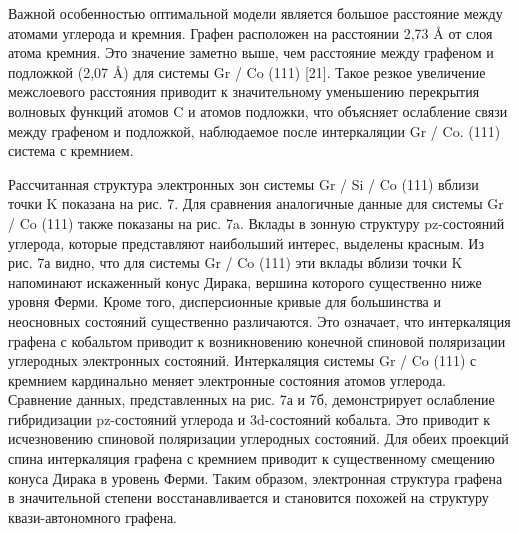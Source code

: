 Важной особенностью оптимальной модели является большое расстояние между атомами углерода и кремния. Графен расположен на расстоянии 2,73 Å от слоя атома кремния. Это значение заметно выше, чем расстояние между графеном и подложкой (2,07 Å) для системы Gr / Co (111) [21]. Такое резкое увеличение межслоевого расстояния приводит к значительному уменьшению перекрытия волновых функций атомов C и атомов подложки, что объясняет ослабление связи между графеном и подложкой, наблюдаемое после интеркаляции Gr / Co. (111) система с кремнием.

Рассчитанная структура электронных зон системы Gr / Si / Co (111) вблизи точки K показана на рис. 7. Для сравнения аналогичные данные для системы Gr / Co (111) также показаны на рис. 7a. Вклады в зонную структуру pz-состояний углерода, которые представляют наибольший интерес, выделены красным. Из рис. 7а видно, что для системы Gr / Co (111) эти вклады вблизи точки K напоминают искаженный конус Дирака, вершина которого существенно ниже уровня Ферми. Кроме того, дисперсионные кривые для большинства и неосновных состояний существенно различаются. Это означает, что интеркаляция графена с кобальтом приводит к возникновению конечной спиновой поляризации углеродных электронных состояний. Интеркаляция системы Gr / Co (111) с кремнием кардинально меняет электронные состояния атомов углерода. Сравнение данных, представленных на рис. 7а и 7б, демонстрирует ослабление гибридизации pz-состояний углерода и 3d-состояний кобальта. Это приводит к исчезновению спиновой поляризации углеродных состояний. Для обеих проекций спина интеркаляция графена с кремнием приводит к существенному смещению конуса Дирака в уровень Ферми. Таким образом, электронная структура графена в значительной степени восстанавливается и становится похожей на структуру квази-автономного графена.